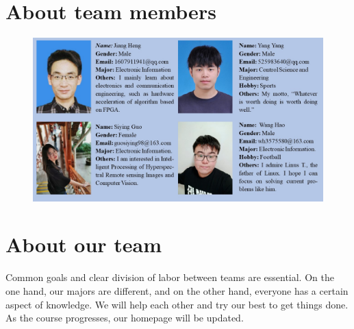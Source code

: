 \documentclass[12pt]{article}
\begin{document}
\section{{\LARGE About team members}}

\begin{figure}[ht]
	\centering
	\includegraphics[width=17cm]{member.jpg}
\end{figure}

\section{{\LARGE About our team}}
Common goals and clear division of labor between teams are essential. On the one hand, our majors are different, and on the other hand, everyone has a certain aspect of knowledge. We will help each other and try our best to get things done.\\
As the course progresses, our homepage will be updated.
\end{document}
